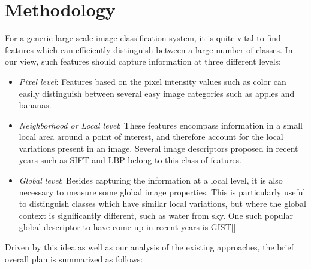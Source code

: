 \documentclass[12pt]{article}
\begin{document}
\section{Methodology}
For a generic large scale image classification system, it is quite vital to find features which can efficiently distinguish between a large number of classes. In our view, such features should capture information at three different levels:

\begin{itemize}
\item \textit{Pixel level}: Features based on the pixel intensity values such as color can easily distinguish between several easy image categories such as apples and bananas.

\item \textit{Neighborhood or Local level}: These features encompass information in a small local area around a point of interest, and therefore account for the local variations present in an image. Several image descriptors proposed in recent years such as SIFT \cite{lowe04} and LBP \cite{ahonen06} belong to this class of features.

\item \textit{Global level}: Besides capturing the information at a local level, it is also necessary to measure some global image properties. This is particularly useful to distinguish classes which have similar local variations, but where the global context is significantly different, such as water from sky. One such popular global descriptor to have come up in recent years is 
GIST[].
\end{itemize}

Driven by this idea as well as our analysis of the existing approaches, the brief overall plan is summarized as follows: 
\end{document}
